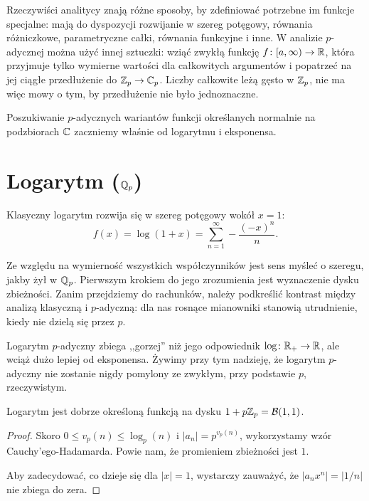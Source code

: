 Rzeczywiści analitycy znają różne sposoby, by zdefiniować potrzebne im funkcje specjalne: mają do dyspozycji rozwijanie w szereg potęgowy, równania różniczkowe, parametryczne całki, równania funkcyjne i inne.
W analizie $p$-adycznej można użyć innej sztuczki: wziąć zwykłą funkcję $f \colon [a, \infty) \to \mathbb R$, która przyjmuje tylko wymierne wartości dla całkowitych argumentów i popatrzeć na jej ciągłe przedłużenie do $\mathbb Z_p \to \mathbb C_p$.
Liczby całkowite leżą gęsto w $\mathbb Z_p$, nie ma więc mowy o tym, by przedłużenie nie było jednoznaczne.

Poszukiwanie $p$-adycznych wariantów funkcji określanych normalnie na podzbiorach $\mathbb C$ zaczniemy właśnie od logarytmu i eksponensa.

\section{Logarytm ($\mathbb Q_p$)}
Klasyczny   logarytm rozwija się w szereg potęgowy wokół $x = 1$:
\begin{equation}
		\label{eq:plogarytm}
	f(x) = \log(1+x) = \sum_{n = 1}^\infty - \frac{(-x)^n}{n}.
\end{equation}

Ze względu na wymierność wszystkich współczynników jest sens myśleć o szeregu, jakby żył w $\mathbb Q_p$.
Pierwszym krokiem do jego zrozumienia jest wyznaczenie dysku zbieżności.
Zanim przejdziemy do rachunków, należy podkreślić kontrast między analizą klasyczną i $p$-adyczną: dla nas rosnące mianowniki stanowią utrudnienie, kiedy nie dzielą się przez $p$.

Logarytm $p$-adyczny zbiega ,,gorzej'' niż jego odpowiednik $\log \colon \mathbb R_+ \to \mathbb R$, ale wciąż dużo lepiej od eksponensa.
Żywimy przy tym nadzieję, że logarytm $p$-adyczny nie zostanie nigdy pomylony ze zwykłym, przy podstawie $p$, rzeczywistym.

\begin{fakt}
	Logarytm jest dobrze określoną funkcją na dysku $1 + p\mathbb Z_p = \mathcal B(1,1)$.
\end{fakt}

\begin{proof}
		Skoro $0 \le v_p(n) \le \log_p (n)$ i $|a_n| = p^{v_p(n)}$, wykorzystamy wzór Cauchy'ego-Hadamarda.
		Powie nam, że promieniem zbieżności jest $1$.

		Aby zadecydować, co dzieje się dla $|x| = 1$, wystarczy zauważyć, że $|a_nx^n| = |1/n|$ nie zbiega do zera.
\end{proof}

